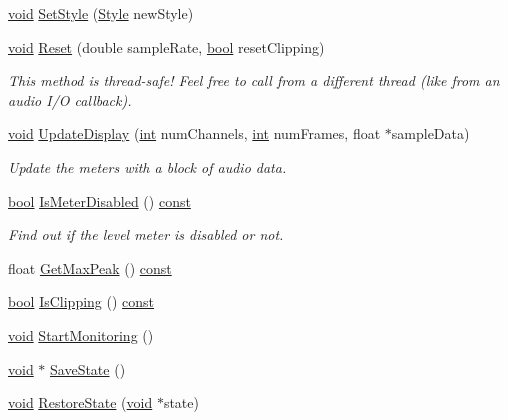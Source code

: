 \begin{DoxyCompactItemize}
\item 
\hyperlink{sound_8c_ae35f5844602719cf66324f4de2a658b3}{void} \hyperlink{class_meter_a74bc7681384b6321c099ae3dd6720eaf}{Set\+Style} (\hyperlink{class_meter_ad530f6dcdd5d69c0380edc4441bec5a9}{Style} new\+Style)
\item 
\hyperlink{sound_8c_ae35f5844602719cf66324f4de2a658b3}{void} \hyperlink{class_meter_a7a885954189425320cba8731d5f2fdd1}{Reset} (double sample\+Rate, \hyperlink{mac_2config_2i386_2lib-src_2libsoxr_2soxr-config_8h_abb452686968e48b67397da5f97445f5b}{bool} reset\+Clipping)
\begin{DoxyCompactList}\small\item\em This method is thread-\/safe! Feel free to call from a different thread (like from an audio I/O callback). \end{DoxyCompactList}\item 
\hyperlink{sound_8c_ae35f5844602719cf66324f4de2a658b3}{void} \hyperlink{class_meter_a91ec3a86b474cd23a470677466093cda}{Update\+Display} (\hyperlink{xmltok_8h_a5a0d4a5641ce434f1d23533f2b2e6653}{int} num\+Channels, \hyperlink{xmltok_8h_a5a0d4a5641ce434f1d23533f2b2e6653}{int} num\+Frames, float $\ast$sample\+Data)
\begin{DoxyCompactList}\small\item\em Update the meters with a block of audio data. \end{DoxyCompactList}\item 
\hyperlink{mac_2config_2i386_2lib-src_2libsoxr_2soxr-config_8h_abb452686968e48b67397da5f97445f5b}{bool} \hyperlink{class_meter_a221e63883014ea8d021a819f353c1e96}{Is\+Meter\+Disabled} () \hyperlink{getopt1_8c_a2c212835823e3c54a8ab6d95c652660e}{const} 
\begin{DoxyCompactList}\small\item\em Find out if the level meter is disabled or not. \end{DoxyCompactList}\item 
float \hyperlink{class_meter_ae37f988c901420dc13c85b6183f11881}{Get\+Max\+Peak} () \hyperlink{getopt1_8c_a2c212835823e3c54a8ab6d95c652660e}{const} 
\item 
\hyperlink{mac_2config_2i386_2lib-src_2libsoxr_2soxr-config_8h_abb452686968e48b67397da5f97445f5b}{bool} \hyperlink{class_meter_a106dafa4f945d0bd57a5edc041d5377f}{Is\+Clipping} () \hyperlink{getopt1_8c_a2c212835823e3c54a8ab6d95c652660e}{const} 
\item 
\hyperlink{sound_8c_ae35f5844602719cf66324f4de2a658b3}{void} \hyperlink{class_meter_a518732eb25bdc5ddab7795df10c7857c}{Start\+Monitoring} ()
\item 
\hyperlink{sound_8c_ae35f5844602719cf66324f4de2a658b3}{void} $\ast$ \hyperlink{class_meter_a11cfcb1ff8281ea084df152b489e8ee6}{Save\+State} ()
\item 
\hyperlink{sound_8c_ae35f5844602719cf66324f4de2a658b3}{void} \hyperlink{class_meter_aaa70d60497535847e5182b247f3d15ae}{Restore\+State} (\hyperlink{sound_8c_ae35f5844602719cf66324f4de2a658b3}{void} $\ast$state)
\end{DoxyCompactItemize}
